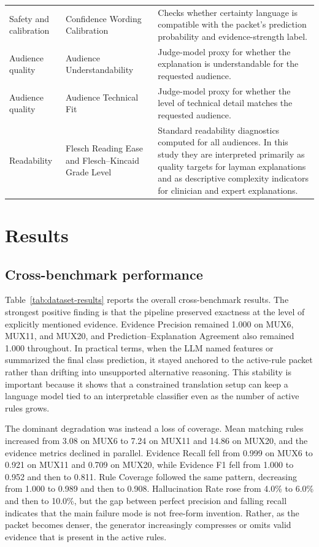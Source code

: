 \documentclass[sigconf,nonacm]{acmart}
\begin{document}
\begin{table}[t]
\begin{tabular}{p{2.8cm}p{2.7cm}p{10.1cm}}
Safety and calibration & Confidence Wording Calibration & Checks whether certainty language is compatible with the packet's prediction probability and evidence-strength label. \\
Audience quality & Audience Understandability & Judge-model proxy for whether the explanation is understandable for the requested audience. \\
Audience quality & Audience Technical Fit & Judge-model proxy for whether the level of technical detail matches the requested audience. \\
Readability & Flesch Reading Ease and Flesch--Kincaid Grade Level & Standard readability diagnostics computed for all audiences. In this study they are interpreted primarily as quality targets for layman explanations and as descriptive complexity indicators for clinician and expert explanations. \\
\bottomrule
\end{tabular}
\end{table}

\section{Results}
\subsection{Cross-benchmark performance}
Table~\ref{tab:dataset-results} reports the overall cross-benchmark results. The strongest positive finding is that the pipeline preserved exactness at the level of explicitly mentioned evidence. Evidence Precision remained 1.000 on MUX6, MUX11, and MUX20, and Prediction--Explanation Agreement also remained 1.000 throughout. In practical terms, when the LLM named features or summarized the final class prediction, it stayed anchored to the active-rule packet rather than drifting into unsupported alternative reasoning. This stability is important because it shows that a constrained translation setup can keep a language model tied to an interpretable classifier even as the number of active rules grows.

The dominant degradation was instead a loss of coverage. Mean matching rules increased from 3.08 on MUX6 to 7.24 on MUX11 and 14.86 on MUX20, and the evidence metrics declined in parallel. Evidence Recall fell from 0.999 on MUX6 to 0.921 on MUX11 and 0.709 on MUX20, while Evidence F1 fell from 1.000 to 0.952 and then to 0.811. Rule Coverage followed the same pattern, decreasing from 1.000 to 0.989 and then to 0.908. Hallucination Rate rose from 4.0\% to 6.0\% and then to 10.0\%, but the gap between perfect precision and falling recall indicates that the main failure mode is not free-form invention. Rather, as the packet becomes denser, the generator increasingly compresses or omits valid evidence that is present in the active rules.
\end{document}
